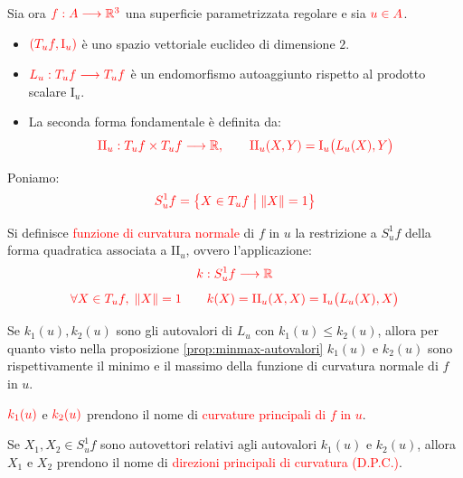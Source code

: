        Sia ora $\textcolor{red}{f : A \longrightarrow \mathbb{R}^3}$ una superficie parametrizzata regolare e sia $\textcolor{red}{u \in A}$.
        \begin{itemize}
            \item $\textcolor{red}{(T_u f, \mathrm{I}_u)}$ è uno spazio vettoriale euclideo di dimensione $2$.
            \item $\textcolor{red}{L_u : T_u f \longrightarrow T_u f}$ è un endomorfismo autoaggiunto rispetto al prodotto scalare $\mathrm{I}_u$.
            \item La seconda forma fondamentale è definita da:
            \[
            \textcolor{red}{\mathrm{II}_u : T_u f \times T_u f \longrightarrow \mathbb{R}, \qquad \mathrm{II}_u(X,Y) = \mathrm{I}_u\big(L_u(X), Y\big)}
            \]
        \end{itemize}
        Poniamo:
        \[
        \textcolor{red}{S_u^1 f = \big\{ X \in T_u f \;\big|\; \lVert X\rVert = 1 \big\}}
        \]

        \begin{definizione}
        \mbox{}

        Si definisce \textcolor{red}{funzione di curvatura normale} di $f$ in $u$ la restrizione 
        a $S_u^1 f$ della forma quadratica associata a $\mathrm{II}_u$, ovvero l'applicazione:
        \[
        \textcolor{red}{k : S_u^1 f \longrightarrow \mathbb{R}}
        \]
        \[
        \textcolor{red}{\forall X \in T_u f, \; \lVert X\rVert = 1 \qquad k(X) = \mathrm{II}_u(X,X) = \mathrm{I}_u\big(L_u(X), X\big)}
        \]
        \end{definizione}

        Se $k_1(u), k_2(u)$ sono gli autovalori di $L_u$ con $k_1(u) \le k_2(u)$, allora per quanto visto nella 
        proposizione \ref{prop:minmax-autovalori} 
        $k_1(u)$ e $k_2(u)$ sono rispettivamente il minimo e il massimo della funzione di curvatura normale di $f$ in $u$.
        \begin{definizione}
        \mbox{}

        $\textcolor{red}{k_1(u)}$ e $\textcolor{red}{k_2(u)}$ prendono il nome di \textcolor{red}{curvature principali di $f$ in $u$}.

        Se $X_1, X_2 \in S_u^1 f$ sono autovettori relativi agli autovalori $k_1(u)$ e $k_2(u)$, allora $X_1$ e $X_2$ prendono il nome di \textcolor{red}{direzioni principali di curvatura (D.P.C.)}.
        \end{definizione}

